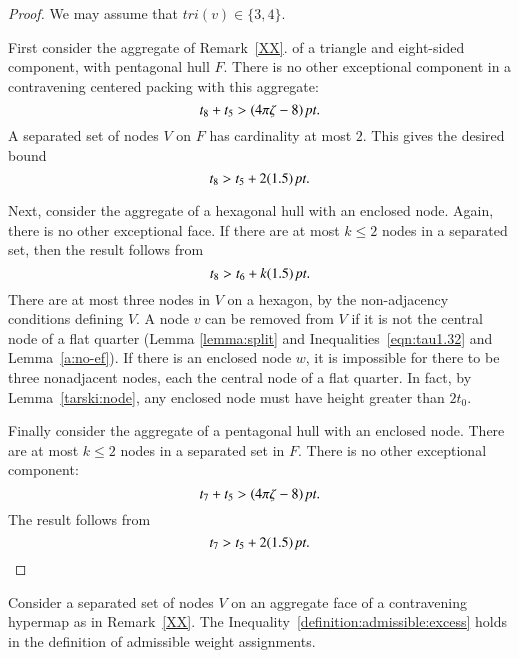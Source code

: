 \begin{proof}
We may assume that $tri(v)\in\{3,4\}$.

First consider the aggregate of Remark~\ref{XX}. of a
triangle and eight-sided component, with pentagonal hull $F$. There
is no other exceptional component in a contravening centered packing
with this aggregate:
    $$t_8 + t_5 > (4\pi\zeta-8)\,\hbox{\it pt}.$$
A separated set of nodes $V$ on $F$ has cardinality at most $2$.
This gives the desired bound $$t_8 > t_5 + 2 (1.5)\,\hbox{\it pt}.$$

Next, consider the aggregate of a hexagonal hull with an enclosed
node.  Again, there is no other exceptional face. If there are at
most $k\le 2$ nodes in a separated set, then the result follows from
    $$t_8 > t_6 + k (1.5)\,\hbox{\it pt}.$$
There are at most three nodes in $V$ on a hexagon, by the
non-adjacency conditions defining $V$. A node $v$ can be removed
from $V$ if it is not the central node of a flat quarter (Lemma
\ref{lemma:split} and Inequalities~\ref{eqn:tau1.32} and
Lemma~\ref{a:no-ef}). If there is an enclosed node $w$, it is
impossible for there to be three nonadjacent nodes, each the central
node of a flat quarter.  In fact, by Lemma~\ref{tarski:node},
any enclosed node must have height greater than $2t_0$.



Finally consider the aggregate of a pentagonal hull with an enclosed
node.  There are at most $k\le2$ nodes in a separated set in $F$.
There is no other exceptional component:
    $$t_7 + t_5 > (4\pi\zeta-8)\,\hbox{\it pt}.$$
The result follows from
    $$t_7 > t_5 + 2(1.5)\,\hbox{\it pt}.$$
\end{proof}

\begin{lemma}
Consider a separated set of nodes $V$ on an aggregate face of a
contravening hypermap as in Remark~\ref{XX}.  The
Inequality~\ref{definition:admissible:excess} holds in the
definition of admissible weight assignments.
\end{lemma}

